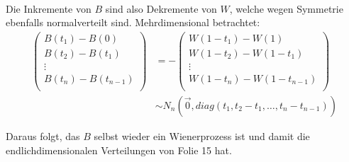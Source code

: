 \documentclass[11pt,a4paper,fullpage]{article}
\begin{document}
\begin{enumerate}
\begin{itemize}
\begin{align*}
\end{align*}
Die Inkremente von $B$ sind also Dekremente von $W$, welche wegen Symmetrie ebenfalls normalverteilt sind. Mehrdimensional betrachtet:
\begin{align*}
\begin{pmatrix*}
B\left(t_1\right) - B\left(0\right) \\
B\left(t_2\right) - B\left(t_1\right) \\
\vdots \\
B\left(t_n\right) - B\left(t_{n-1}\right) \\
\end{pmatrix*} &= -
\begin{pmatrix*}
W\left(1-t_1\right) - W\left(1\right) \\
W\left(1-t_2\right) - W\left(1-t_1\right) \\
\vdots \\
W\left(1-t_n\right) - W\left(1-t_{n-1}\right) \\
\end{pmatrix*} \\
&\sim N_n\left(\vec 0, diag\left(t_1, t_2-t_1, \hdots, t_n - t_{n-1}\right)\right)
\end{align*}
\end{itemize}
Daraus folgt, das $B$ selbst wieder ein Wienerprozess ist und damit die endlichdimensionalen Verteilungen von Folie 15 hat.


\end{enumerate}
\end{document}
